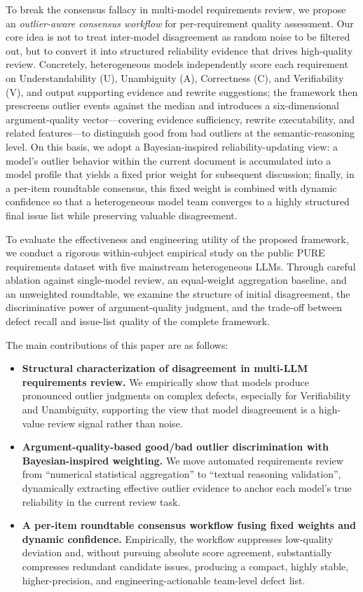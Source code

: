 \documentclass[sn-mathphys-num]{sn-jnl}
\begin{document}
To break the consensus fallacy in multi-model requirements review, we propose an \emph{outlier-aware consensus workflow} for per-requirement quality assessment. Our core idea is not to treat inter-model disagreement as random noise to be filtered out, but to convert it into structured reliability evidence that drives high-quality review. Concretely, heterogeneous models independently score each requirement on Understandability (U), Unambiguity (A), Correctness (C), and Verifiability (V), and output supporting evidence and rewrite suggestions; the framework then prescreens outlier events against the median and introduces a six-dimensional argument-quality vector---covering evidence sufficiency, rewrite executability, and related features---to distinguish good from bad outliers at the semantic-reasoning level. On this basis, we adopt a Bayesian-inspired reliability-updating view: a model's outlier behavior within the current document is accumulated into a model profile that yields a fixed prior weight for subsequent discussion; finally, in a per-item roundtable consensus, this fixed weight is combined with dynamic confidence so that a heterogeneous model team converges to a highly structured final issue list while preserving valuable disagreement.

To evaluate the effectiveness and engineering utility of the proposed framework, we conduct a rigorous within-subject empirical study on the public PURE requirements dataset with five mainstream heterogeneous LLMs. Through careful ablation against single-model review, an equal-weight aggregation baseline, and an unweighted roundtable, we examine the structure of initial disagreement, the discriminative power of argument-quality judgment, and the trade-off between defect recall and issue-list quality of the complete framework.

The main contributions of this paper are as follows:
\begin{itemize}
\item \textbf{Structural characterization of disagreement in multi-LLM requirements review.} We empirically show that models produce pronounced outlier judgments on complex defects, especially for Verifiability and Unambiguity, supporting the view that model disagreement is a high-value review signal rather than noise.
\item \textbf{Argument-quality-based good/bad outlier discrimination with Bayesian-inspired weighting.} We move automated requirements review from ``numerical statistical aggregation'' to ``textual reasoning validation'', dynamically extracting effective outlier evidence to anchor each model's true reliability in the current review task.
\item \textbf{A per-item roundtable consensus workflow fusing fixed weights and dynamic confidence.} Empirically, the workflow suppresses low-quality deviation and, without pursuing absolute score agreement, substantially compresses redundant candidate issues, producing a compact, highly stable, higher-precision, and engineering-actionable team-level defect list.
\end{itemize}
\end{document}
